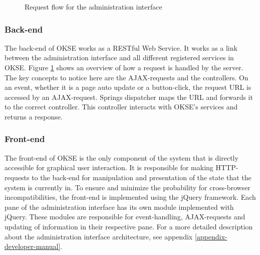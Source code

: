 \begin{center}
  \begin{figure}[ht!]
    \caption{Request flow for the administration interface}
    \label{fig:oac-request-flow}
  \end{figure}
\end{center}

\subsubsection{Back-end}

The back-end of OKSE works as a RESTful Web Service. It works as a link between the administration interface and all different registered services in OKSE. Figure \ref{fig:oac-request-flow} shows an overview of how a request is handled by the server. The key concepts to notice here are the AJAX-requests and the controllers. On an event, whether it is a page auto update or a button-click, the request URL is accessed by an AJAX-request. Springs dispatcher maps the URL and forwards it to the correct controller. This controller interacts with OKSE's services and returns a response. 

\subsubsection{Front-end}

The front-end of OKSE is the only component of the system that is directly accessible for graphical user interaction. It is responsible for making HTTP-requests to the back-end for manipulation and presentation of the state that the system is currently in. To ensure and minimize the probability for cross-browser incompatibilities, the front-end is implemented using the jQuery framework. Each pane of the administration interface has its own module implemented with jQuery. These modules are responsible for event-handling, AJAX-requests and updating of information in their respective pane.
For a more detailed description about the administration interface architecture, see appendix \ref{appendix-developer-manual}.

\clearpage
